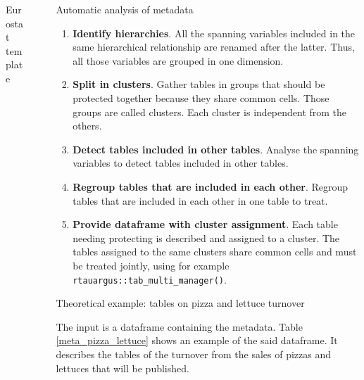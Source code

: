 \documentclass[final]{beamer}
\newlength{\sepwidth}
\newlength{\colwidth}
\newcommand{\separatorcolumn}{\begin{column}{\sepwidth}\end{column}}
\begin{document}
\begin{frame}[fragile]
\begin{columns}[t]
\begin{column}{\colwidth}
\begin{block}{Eurostat template}
    
  \end{block}

\end{column} %

\separatorcolumn

\begin{column}{\colwidth}

  \begin{alertblock}{Automatic analysis of metadata}

    \begin{enumerate}
      \item \textbf{Identify hierarchies}. All the spanning variables included in the same hierarchical relationship are renamed after the latter. Thus, all those variables are grouped in one dimension. 
      \item \textbf{Split in clusters}. Gather tables in groups that should be protected together because they share common cells. Those groups are called clusters. Each cluster is independent from the others.
      \item \textbf{Detect tables included in other tables}. Analyse the spanning variables to detect tables included in other tables.
      \item \textbf{Regroup tables that are included in each other}. Regroup tables that are included in each other in one table to treat.
      \item \textbf{Provide dataframe with cluster assignment}. Each table needing protecting is described and assigned to a cluster. The tables assigned to the same clusters share common cells and must be treated jointly, using for example \texttt{rtauargus::tab\_multi\_manager()}.
    \end{enumerate}

  \end{alertblock}

  \begin{block}{Theoretical example: tables on pizza and lettuce turnover}

    The input is a dataframe containing the metadata. Table \ref{meta_pizza_lettuce} shows an example of the said dataframe. It describes the tables of the turnover from the sales of pizzas and lettuces that will be published.


\end{block}
\end{column}
\end{columns}
\end{frame}
\end{document}
